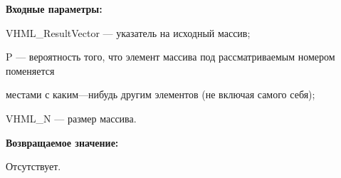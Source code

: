 \textbf{Входные параметры:}  
 
VHML\_ResultVector --- указатель на исходный массив;
 
P --- вероятность того, что элемент массива под рассматриваемым номером поменяется
 
местами с каким---нибудь другим элементов (не включая самого себя);
 
VHML\_N --- размер массива.

\textbf{Возвращаемое значение:}

Отсутствует.